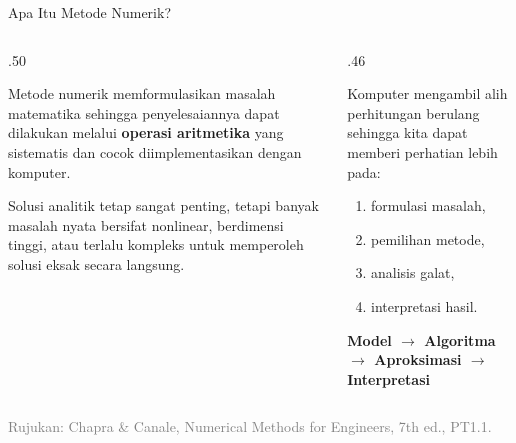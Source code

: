 \documentclass[aspectratio=169,10pt]{beamer}
\newcommand{\smallgray}[1]{\textcolor{GrayText}{\scriptsize #1}}
\begin{document}
\begin{frame}{Apa Itu Metode Numerik?}
\small
\begin{columns}[T,totalwidth=\textwidth]
\begin{column}{.50\textwidth}
\begin{bluebox}
Metode numerik memformulasikan masalah matematika sehingga penyelesaiannya dapat dilakukan melalui \textbf{operasi aritmetika} yang sistematis dan cocok diimplementasikan dengan komputer.
\end{bluebox}
\begin{orangebox}
Solusi analitik tetap sangat penting, tetapi banyak masalah nyata bersifat nonlinear, berdimensi tinggi, atau terlalu kompleks untuk memperoleh solusi eksak secara langsung.
\end{orangebox}
\end{column}
\begin{column}{.46\textwidth}
\begin{greenbox}
Komputer mengambil alih perhitungan berulang sehingga kita dapat memberi perhatian lebih pada:
\begin{enumerate}\setlength\itemsep{2pt}
\item formulasi masalah,
\item pemilihan metode,
\item analisis galat,
\item interpretasi hasil.
\end{enumerate}
\end{greenbox}
\begin{goldbox}[Alur]
\centering \textbf{Model $\rightarrow$ Algoritma $\rightarrow$ Aproksimasi $\rightarrow$ Interpretasi}
\end{goldbox}
\end{column}
\end{columns}
\vfill
\smallgray{Rujukan: Chapra \& Canale, Numerical Methods for Engineers, 7th ed., PT1.1.}
\end{frame}
\end{document}

